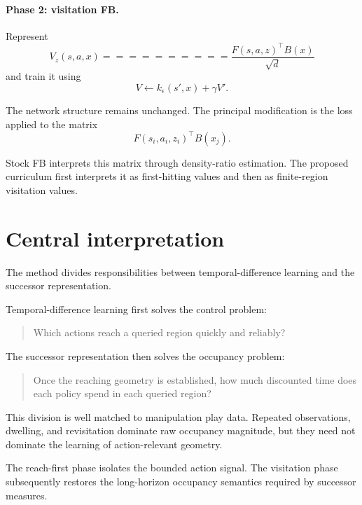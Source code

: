 \documentclass[10pt]{article}
\begin{document}
\paragraph{Phase 2: visitation FB.}
Represent
\begin{equation}
V_z(s,a,x)
==========

\frac{F(s,a,z)^\top B(x)}{\sqrt d}
\end{equation}
and train it using
\begin{equation}
V
\leftarrow
k_\epsilon(s',x)
+
\gamma V'.
\end{equation}

The network structure remains unchanged.
The principal modification is the loss applied to the matrix
\begin{equation}
F(s_i,a_i,z_i)^\top B(x_j).
\end{equation}

Stock FB interprets this matrix through density-ratio estimation.
The proposed curriculum first interprets it as first-hitting values and then as
finite-region visitation values.

\section{Central interpretation}

The method divides responsibilities between temporal-difference learning and the
successor representation.

Temporal-difference learning first solves the control problem:
\begin{quote}
Which actions reach a queried region quickly and reliably?
\end{quote}

The successor representation then solves the occupancy problem:
\begin{quote}
Once the reaching geometry is established, how much discounted time does each policy
spend in each queried region?
\end{quote}

This division is well matched to manipulation play data.
Repeated observations, dwelling, and revisitation dominate raw occupancy magnitude, but
they need not dominate the learning of action-relevant geometry.

The reach-first phase isolates the bounded action signal.
The visitation phase subsequently restores the long-horizon occupancy semantics required
by successor measures.
\end{document}
